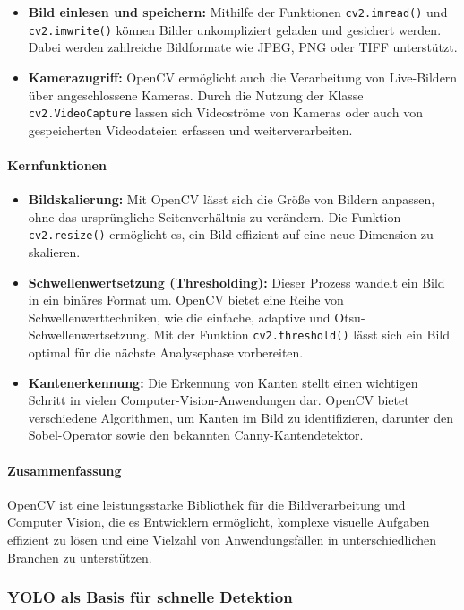 \begin{itemize}
    \item \textbf{Bild einlesen und speichern:} Mithilfe der Funktionen \texttt{cv2.imread()} und \texttt{cv2.imwrite()} können Bilder unkompliziert geladen und gesichert werden. Dabei werden zahlreiche Bildformate wie JPEG, PNG oder TIFF unterstützt.
    \item \textbf{Kamerazugriff:} OpenCV ermöglicht auch die Verarbeitung von Live-Bildern über angeschlossene Kameras. Durch die Nutzung der Klasse \texttt{cv2.VideoCapture} lassen sich Videoströme von Kameras oder auch von gespeicherten Videodateien erfassen und weiterverarbeiten.
\end{itemize}

\paragraph{Kernfunktionen}
\begin{itemize}
    \item \textbf{Bildskalierung:} Mit OpenCV lässt sich die Größe von Bildern anpassen, ohne das ursprüngliche Seitenverhältnis zu verändern. Die Funktion \texttt{cv2.resize()} ermöglicht es, ein Bild effizient auf eine neue Dimension zu skalieren.
    \item \textbf{Schwellenwertsetzung (Thresholding):} Dieser Prozess wandelt ein Bild in ein binäres Format um. OpenCV bietet eine Reihe von Schwellenwerttechniken, wie die einfache, adaptive und Otsu-Schwellenwertsetzung. Mit der Funktion \texttt{cv2.threshold()} lässt sich ein Bild optimal für die nächste Analysephase vorbereiten.
    \item \textbf{Kantenerkennung:} Die Erkennung von Kanten stellt einen wichtigen Schritt in vielen Computer-Vision-Anwendungen dar. OpenCV bietet verschiedene Algorithmen, um Kanten im Bild zu identifizieren, darunter den Sobel-Operator sowie den bekannten Canny-Kantendetektor.
\end{itemize}

\paragraph{Zusammenfassung}
OpenCV ist eine leistungsstarke Bibliothek für die Bildverarbeitung und Computer Vision, die es Entwicklern ermöglicht, komplexe visuelle Aufgaben effizient zu lösen und eine Vielzahl von Anwendungsfällen in unterschiedlichen Branchen zu unterstützen.\cite{SchneppatOpenCV}

\subsubsection{YOLO als Basis für schnelle Detektion}

